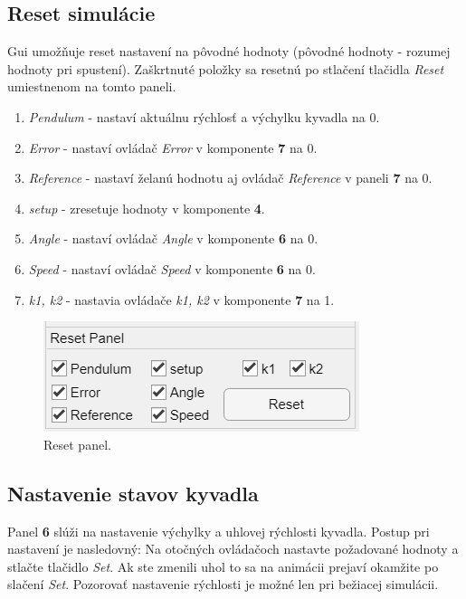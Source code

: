   
 \subsection{Reset simulácie}
 Gui umožňuje reset nastavení na pôvodné hodnoty (pôvodné hodnoty - rozumej hodnoty pri spustení). Zaškrtnuté položky sa resetnú po stlačení tlačidla \textit{Reset} umiestnenom na tomto paneli.
 \begin{enumerate}
 	\item \textit{Pendulum} - nastaví aktuálnu rýchlosť a výchylku kyvadla na 0.
 	\item \textit{Error} - nastaví ovládač \textit{Error} v komponente \textbf{7} na 0.
 	\item \textit{Reference} - nastaví želanú hodnotu aj ovládač \textit{Reference} v paneli \textbf{7} na 0.
 	\item \textit{setup} - zresetuje hodnoty v komponente \textbf{4}.
 	\item \textit{Angle} - nastaví ovládač \textit{Angle} v komponente \textbf{6} na 0.
 	\item \textit{Speed} - nastaví ovládač \textit{Speed} v komponente \textbf{6} na 0.
  	\item \textit{k1, k2} - nastavia ovládače \textit{k1, k2} v komponente \textbf{7} na 1.
 \end{enumerate}
   	\begin{figure}[h!]
 	\centering
 	\includegraphics[width=0.7\linewidth]{reset}
 	\caption{Reset panel.}
 	\label{fig:reset}
 \end{figure}
 \subsection{Nastavenie stavov kyvadla}
 Panel \textbf{6} slúži na nastavenie výchylky a uhlovej rýchlosti kyvadla. Postup pri nastavení je nasledovný: Na otočných ovládačoch nastavte požadované hodnoty a stlačte tlačidlo \textit{Set}. Ak ste zmenili uhol to sa na animácii prejaví okamžite po slačení \textit{Set}. Pozorovať nastavenie rýchlosti je možné len pri bežiacej simulácii.
 
